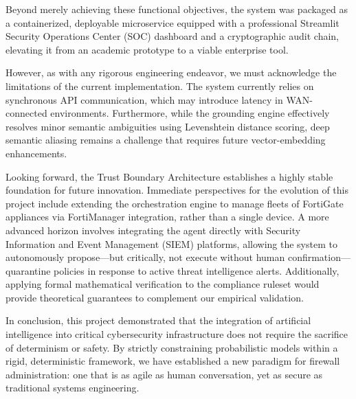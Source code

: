 Beyond merely achieving these functional objectives, the system was packaged as a containerized, deployable microservice equipped with a professional Streamlit Security Operations Center (SOC) dashboard and a cryptographic audit chain, elevating it from an academic prototype to a viable enterprise tool.

However, as with any rigorous engineering endeavor, we must acknowledge the limitations of the current implementation. The system currently relies on synchronous API communication, which may introduce latency in WAN-connected environments. Furthermore, while the grounding engine effectively resolves minor semantic ambiguities using Levenshtein distance scoring, deep semantic aliasing remains a challenge that requires future vector-embedding enhancements. 

Looking forward, the Trust Boundary Architecture establishes a highly stable foundation for future innovation. Immediate perspectives for the evolution of this project include extending the orchestration engine to manage fleets of FortiGate appliances via FortiManager integration, rather than a single device. A more advanced horizon involves integrating the agent directly with Security Information and Event Management (SIEM) platforms, allowing the system to autonomously propose—but critically, not execute without human confirmation—quarantine policies in response to active threat intelligence alerts. Additionally, applying formal mathematical verification to the compliance ruleset would provide theoretical guarantees to complement our empirical validation.

In conclusion, this project demonstrated that the integration of artificial intelligence into critical cybersecurity infrastructure does not require the sacrifice of determinism or safety. By strictly constraining probabilistic models within a rigid, deterministic framework, we have established a new paradigm for firewall administration: one that is as agile as human conversation, yet as secure as traditional systems engineering.
